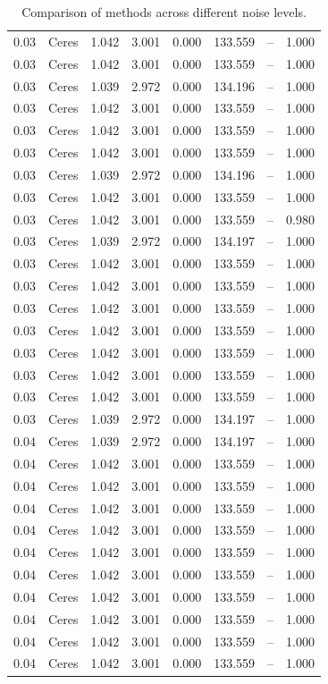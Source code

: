 \begin{table}[H]
\begin{tabular}{l c l l l}
0.03 & Ceres & 1.042 & 3.001 & 0.000 & 133.559 & -- & 1.000 \\
0.03 & Ceres & 1.042 & 3.001 & 0.000 & 133.559 & -- & 1.000 \\
0.03 & Ceres & 1.039 & 2.972 & 0.000 & 134.196 & -- & 1.000 \\
0.03 & Ceres & 1.042 & 3.001 & 0.000 & 133.559 & -- & 1.000 \\
0.03 & Ceres & 1.042 & 3.001 & 0.000 & 133.559 & -- & 1.000 \\
0.03 & Ceres & 1.042 & 3.001 & 0.000 & 133.559 & -- & 1.000 \\
0.03 & Ceres & 1.039 & 2.972 & 0.000 & 134.196 & -- & 1.000 \\
0.03 & Ceres & 1.042 & 3.001 & 0.000 & 133.559 & -- & 1.000 \\
0.03 & Ceres & 1.042 & 3.001 & 0.000 & 133.559 & -- & 0.980 \\
0.03 & Ceres & 1.039 & 2.972 & 0.000 & 134.197 & -- & 1.000 \\
0.03 & Ceres & 1.042 & 3.001 & 0.000 & 133.559 & -- & 1.000 \\
0.03 & Ceres & 1.042 & 3.001 & 0.000 & 133.559 & -- & 1.000 \\
0.03 & Ceres & 1.042 & 3.001 & 0.000 & 133.559 & -- & 1.000 \\
0.03 & Ceres & 1.042 & 3.001 & 0.000 & 133.559 & -- & 1.000 \\
0.03 & Ceres & 1.042 & 3.001 & 0.000 & 133.559 & -- & 1.000 \\
0.03 & Ceres & 1.042 & 3.001 & 0.000 & 133.559 & -- & 1.000 \\
0.03 & Ceres & 1.042 & 3.001 & 0.000 & 133.559 & -- & 1.000 \\
0.03 & Ceres & 1.039 & 2.972 & 0.000 & 134.197 & -- & 1.000 \\
0.04 & Ceres & 1.039 & 2.972 & 0.000 & 134.197 & -- & 1.000 \\
0.04 & Ceres & 1.042 & 3.001 & 0.000 & 133.559 & -- & 1.000 \\
0.04 & Ceres & 1.042 & 3.001 & 0.000 & 133.559 & -- & 1.000 \\
0.04 & Ceres & 1.042 & 3.001 & 0.000 & 133.559 & -- & 1.000 \\
0.04 & Ceres & 1.042 & 3.001 & 0.000 & 133.559 & -- & 1.000 \\
0.04 & Ceres & 1.042 & 3.001 & 0.000 & 133.559 & -- & 1.000 \\
0.04 & Ceres & 1.042 & 3.001 & 0.000 & 133.559 & -- & 1.000 \\
0.04 & Ceres & 1.042 & 3.001 & 0.000 & 133.559 & -- & 1.000 \\
0.04 & Ceres & 1.042 & 3.001 & 0.000 & 133.559 & -- & 1.000 \\
0.04 & Ceres & 1.042 & 3.001 & 0.000 & 133.559 & -- & 1.000 \\
0.04 & Ceres & 1.042 & 3.001 & 0.000 & 133.559 & -- & 1.000 \\
\midrule
\bottomrule
\end{tabular}
\label{tab:SyntheticNoise}
\caption{Comparison of methods across different noise levels.}
\end{table}
